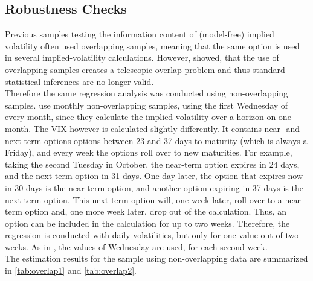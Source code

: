 %
\label{tab:newey2}


\subsection{Robustness Checks}\label{sec51Robustness}

Previous samples testing the information content of (model-free) implied volatility often used overlapping samples, meaning that the same option is used in several implied-volatility calculations. However, \textcite{christensen1998} showed, that the use of overlapping samples creates a telescopic overlap problem and thus standard statistical inferences are no longer valid.\\
Therefore the same regression analysis was conducted using non-overlapping samples. \textcite{jiang2003} use monthly non-overlapping samples, using the first Wednesday of every month, since they calculate the implied volatility over a horizon on one month. The VIX however is calculated slightly differently. It contains near- and next-term options options between 23 and 37 days to maturity (which is always a Friday), and every week the options roll over to new maturities. For example, taking the second Tuesday in October, the near-term option expires in 24 days, and the next-term option in 31 days. One day later, the option that expires now in 30 days is the near-term option, and another option expiring in 37 days is the next-term option. This next-term option will, one week later, roll over to a near-term option and, one more week later, drop out of the calculation. Thus, an option can be included in the calculation for up to two weeks. Therefore, the regression is conducted with daily volatilities, but only for one value out of two weeks. As in \textcite{jiang2003}, the values of Wednesday are used, for each second week. \\
The estimation results for the sample using non-overlapping data are summarized in \ref{tab:overlap1} and \ref{tab:overlap2}.




\newpage
















